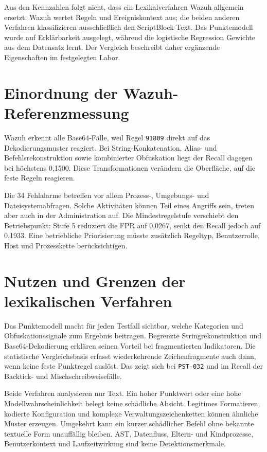 \documentclass[12pt,a4paper,oneside,parskip=half]{scrreprt}
\begin{document}
Aus den Kennzahlen folgt nicht, dass ein Lexikalverfahren Wazuh allgemein ersetzt. Wazuh wertet Regeln und Ereigniskontext aus; die beiden anderen Verfahren klassifizieren ausschließlich den ScriptBlock-Text. Das Punktemodell wurde auf Erklärbarkeit ausgelegt, während die logistische Regression Gewichte aus dem Datensatz lernt. Der Vergleich beschreibt daher ergänzende Eigenschaften im festgelegten Labor.

\section{Einordnung der Wazuh-Referenzmessung}
Wazuh erkennt alle Base64-Fälle, weil Regel \texttt{91809} direkt auf das Dekodierungsmuster reagiert. Bei String-Konkatenation, Alias- und Befehlsrekonstruktion sowie kombinierter Obfuskation liegt der Recall dagegen bei höchstens 0{,}1500. Diese Transformationen verändern die Oberfläche, auf die feste Regeln reagieren.

Die 34 Fehlalarme betreffen vor allem Prozess-, Umgebungs- und Dateisystemabfragen. Solche Aktivitäten können Teil eines Angriffs sein, treten aber auch in der Administration auf. Die Mindestregelstufe verschiebt den Betriebspunkt: Stufe 5 reduziert die FPR auf 0{,}0267, senkt den Recall jedoch auf 0{,}1933. Eine betriebliche Priorisierung müsste zusätzlich Regeltyp, Benutzerrolle, Host und Prozesskette berücksichtigen.

\section{Nutzen und Grenzen der lexikalischen Verfahren}
Das Punktemodell macht für jeden Testfall sichtbar, welche Kategorien und Obfuskationssignale zum Ergebnis beitragen. Begrenzte Stringrekonstruktion und Base64-Dekodierung erklären seinen Vorteil bei fragmentierten Indikatoren. Die statistische Vergleichsbasis erfasst wiederkehrende Zeichenfragmente auch dann, wenn keine feste Punktregel auslöst. Das zeigt sich bei \texttt{PST-032} und im Recall der Backtick- und Mischschreibweisefälle.

Beide Verfahren analysieren nur Text. Ein hoher Punktwert oder eine hohe Modellwahrscheinlichkeit belegt keine schädliche Absicht. Legitimes Formatieren, kodierte Konfiguration und komplexe Verwaltungszeichenketten können ähnliche Muster erzeugen. Umgekehrt kann ein kurzer schädlicher Befehl ohne bekannte textuelle Form unauffällig bleiben. AST, Datenfluss, Eltern- und Kindprozesse, Benutzerkontext und Laufzeitwirkung sind keine Detektionsmerkmale.
\end{document}
